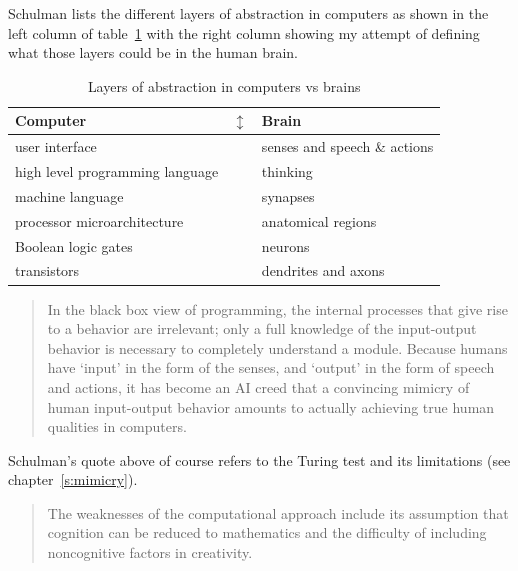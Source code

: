 Schulman lists the different layers of abstraction in computers as shown in the left column of table~\ref{tab:abstr} with the right column showing my attempt of defining what those layers could be in the human brain.

\begin{table}[!htbp]
\centering
\caption{Layers of abstraction in computers vs brains}
\label{tab:abstr}
  \begin{tabular}{@{}lcl@{}}
  \toprule
  \textbf{Computer} & \multirow{6}{*}{$\updownarrow$} & \textbf{Brain} \\ 
  \midrule
  user interface                  &  & senses and speech \& actions \\
  high level programming language &  & thinking            \\
  machine language                &  & synapses            \\
  processor microarchitecture     &  & anatomical regions  \\
  Boolean logic gates             &  & neurons             \\
  transistors                     &  & dendrites and axons \\ 
  \bottomrule
  \end{tabular}
\end{table}

\begin{quotation}
  In the black box view of programming, the internal processes that give rise to a behavior are irrelevant; only a full knowledge of the input-output behavior is necessary to completely understand a module. Because humans have `input' in the form of the senses, and `output' in the form of speech and actions, it has become an AI creed that a convincing mimicry of human input-output behavior amounts to actually achieving true human qualities in computers. \autocite{Schulman2009}
\end{quotation}

Schulman's quote above of course refers to the Turing test and its limitations (see chapter~\ref{s:mimicry}).

\begin{quotation}
  The weaknesses of the computational approach include its assumption that cognition can be reduced to mathematics and the difficulty of including noncognitive factors in creativity. 
\end{quotation}

